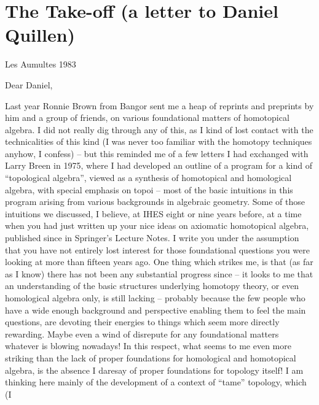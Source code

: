 
\chapter{The Take-off (a letter to Daniel Quillen)}
\label{ch:I}

\par\hfill Les Aumultes 1983\par

Dear Daniel,

\label{sec:1}%
Last year Ronnie Brown from Bangor sent me a heap of reprints and
preprints by him and a group of friends, on various foundational
matters of homotopical algebra. I did not really dig through any of
this, as I kind of lost contact with the technicalities of this kind
(I was never too familiar with the homotopy techniques anyhow, I
confess) -- but this reminded me of a few letters I had exchanged with
Larry Breen in 1975, where I had developed an outline of a program for
a kind of ``topological algebra'', viewed as a synthesis of
homotopical and homological algebra, with special emphasis on topoi --
most of the basic intuitions in this program arising from various
backgrounds in algebraic geometry. Some of those intuitions we
discussed, I believe, at IHES eight or nine years before, at a time
when you had just written up your nice ideas on axiomatic homotopical
algebra, published since in
Springer's Lecture Notes. I write you under the assumption that you
have not entirely lost interest for those foundational questions you
were looking at more than fifteen years ago. One thing which strikes
me, is that (as far as I know) there has not been any substantial
progress since -- it looks to me that an understanding of the basic
structures underlying homotopy theory, or even homological algebra
only, is still lacking -- probably because the few people who have a
wide enough background and perspective enabling them to feel the main
questions, are devoting their energies to things which seem more
directly rewarding. Maybe even a wind of disrepute for any
foundational matters whatever is blowing nowadays!  In this respect,
what seems to me even more striking than the lack of proper
foundations for homological and homotopical algebra, is the absence I
daresay of proper foundations for topology itself! I am thinking here
mainly of the development of a context of ``tame'' topology, which (I
